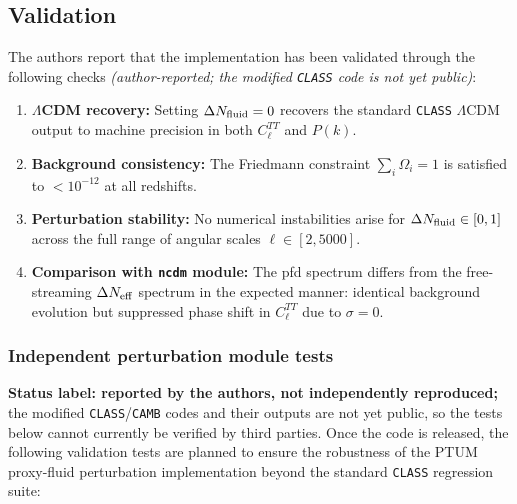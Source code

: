 \documentclass[epj]{svjour}
\begin{document}
\subsection{Validation}

The authors report that the implementation has been validated through
the following checks \emph{(author-reported; the modified
\texttt{CLASS} code is not yet public)}:

\begin{enumerate}
\item \textbf{$\Lambda$CDM recovery:} Setting
      $\Delta N_{\rm fluid}=0$ recovers the standard \texttt{CLASS}
      $\Lambda$CDM output to machine precision in both
      $C_\ell^{TT}$ and $P(k)$.

\item \textbf{Background consistency:} The Friedmann constraint
      $\sum_i\Omega_i=1$ is satisfied to $<10^{-12}$ at all
      redshifts.

\item \textbf{Perturbation stability:} No numerical instabilities
      arise for $\Delta N_{\rm fluid}\in[0,1]$ across the full
      range of angular scales $\ell\in[2,5000]$.

\item \textbf{Comparison with \texttt{ncdm} module:} The pfd
      spectrum differs from the free-streaming
      $\Delta N_{\rm eff}$ spectrum in the expected manner:
      identical background evolution but suppressed phase shift
      in $C_\ell^{TT}$ due to $\sigma=0$.
\end{enumerate}

\subsubsection{Independent perturbation module tests}
\label{app:class_validation}

\textbf{Status label: reported by the authors, not independently
reproduced;} the modified \texttt{CLASS}/\texttt{CAMB} codes and their
outputs are not yet public, so the tests below cannot currently be
verified by third parties. Once the code is released, the following
validation tests are planned to ensure the robustness of the PTUM
proxy-fluid perturbation implementation beyond the standard
\texttt{CLASS} regression suite:
\end{document}
